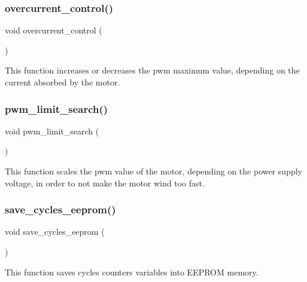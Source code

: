 \subsubsection{overcurrent\+\_\+control()}
{\footnotesize\ttfamily void overcurrent\+\_\+control (\begin{DoxyParamCaption}{ }\end{DoxyParamCaption})}

This function increases or decreases the pwm maximum value, depending on the current absorbed by the motor. \mbox{\label{interruptions_8h_ab7b287cf5df2ea548297b951be2f20d4}} 
\subsubsection{pwm\+\_\+limit\+\_\+search()}
{\footnotesize\ttfamily void pwm\+\_\+limit\+\_\+search (\begin{DoxyParamCaption}{ }\end{DoxyParamCaption})}

This function scales the pwm value of the motor, depending on the power supply voltage, in order to not make the motor wind too fast. \mbox{\label{interruptions_8h_ad86170580c30277d97216739e8508a13}} 
\subsubsection{save\+\_\+cycles\+\_\+eeprom()}
{\footnotesize\ttfamily void save\+\_\+cycles\+\_\+eeprom (\begin{DoxyParamCaption}{ }\end{DoxyParamCaption})}

This function saves cycles counters variables into E\+E\+P\+R\+OM memory. 